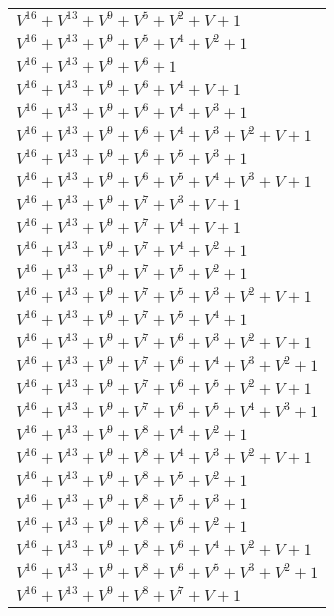 \documentclass[12pt]{article}
\begin{document}
\begin{adjustwidth}{-4cm}{}
\begin{center}
\begin{longtable}{|l|}
$V^{16}  +V^{13}  +V^{9}  +V^{5}  +V^{2}  + V + 1$ \\
$V^{16}  +V^{13}  +V^{9}  +V^{5}  +V^{4}  +V^{2}  + 1$ \\
$V^{16}  +V^{13}  +V^{9}  +V^{6}  + 1$ \\
$V^{16}  +V^{13}  +V^{9}  +V^{6}  +V^{4}  + V + 1$ \\
$V^{16}  +V^{13}  +V^{9}  +V^{6}  +V^{4}  +V^{3}  + 1$ \\
$V^{16}  +V^{13}  +V^{9}  +V^{6}  +V^{4}  +V^{3}  +V^{2}  + V + 1$ \\
$V^{16}  +V^{13}  +V^{9}  +V^{6}  +V^{5}  +V^{3}  + 1$ \\
$V^{16}  +V^{13}  +V^{9}  +V^{6}  +V^{5}  +V^{4}  +V^{3}  + V + 1$ \\
$V^{16}  +V^{13}  +V^{9}  +V^{7}  +V^{3}  + V + 1$ \\
$V^{16}  +V^{13}  +V^{9}  +V^{7}  +V^{4}  + V + 1$ \\
$V^{16}  +V^{13}  +V^{9}  +V^{7}  +V^{4}  +V^{2}  + 1$ \\
$V^{16}  +V^{13}  +V^{9}  +V^{7}  +V^{5}  +V^{2}  + 1$ \\
$V^{16}  +V^{13}  +V^{9}  +V^{7}  +V^{5}  +V^{3}  +V^{2}  + V + 1$ \\
$V^{16}  +V^{13}  +V^{9}  +V^{7}  +V^{5}  +V^{4}  + 1$ \\
$V^{16}  +V^{13}  +V^{9}  +V^{7}  +V^{6}  +V^{3}  +V^{2}  + V + 1$ \\
$V^{16}  +V^{13}  +V^{9}  +V^{7}  +V^{6}  +V^{4}  +V^{3}  +V^{2}  + 1$ \\
$V^{16}  +V^{13}  +V^{9}  +V^{7}  +V^{6}  +V^{5}  +V^{2}  + V + 1$ \\
$V^{16}  +V^{13}  +V^{9}  +V^{7}  +V^{6}  +V^{5}  +V^{4}  +V^{3}  + 1$ \\
$V^{16}  +V^{13}  +V^{9}  +V^{8}  +V^{4}  +V^{2}  + 1$ \\
$V^{16}  +V^{13}  +V^{9}  +V^{8}  +V^{4}  +V^{3}  +V^{2}  + V + 1$ \\
$V^{16}  +V^{13}  +V^{9}  +V^{8}  +V^{5}  +V^{2}  + 1$ \\
$V^{16}  +V^{13}  +V^{9}  +V^{8}  +V^{5}  +V^{3}  + 1$ \\
$V^{16}  +V^{13}  +V^{9}  +V^{8}  +V^{6}  +V^{2}  + 1$ \\
$V^{16}  +V^{13}  +V^{9}  +V^{8}  +V^{6}  +V^{4}  +V^{2}  + V + 1$ \\
$V^{16}  +V^{13}  +V^{9}  +V^{8}  +V^{6}  +V^{5}  +V^{3}  +V^{2}  + 1$ \\
$V^{16}  +V^{13}  +V^{9}  +V^{8}  +V^{7}  + V + 1$ \\

\end{longtable}
\end{center}
\end{adjustwidth}
\end{document}
